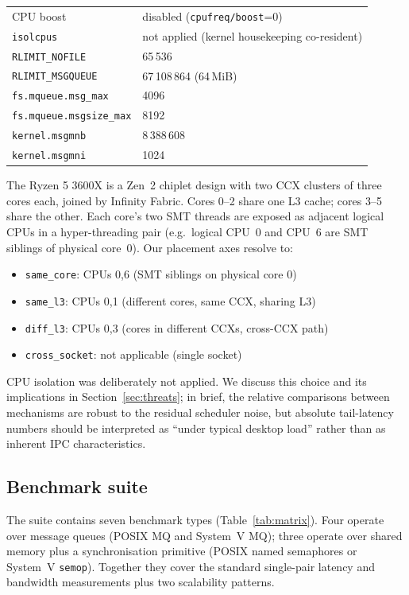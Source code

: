 \documentclass[a4paper,11pt]{article}
\begin{document}
\begin{table}[H]
\begin{tabular}{ll}
CPU boost            & disabled (\texttt{cpufreq/boost}=0) \\
\texttt{isolcpus}    & not applied (kernel housekeeping co-resident) \\
\texttt{RLIMIT\_NOFILE}    & 65\,536 \\
\texttt{RLIMIT\_MSGQUEUE}  & 67\,108\,864 (64\,MiB) \\
\texttt{fs.mqueue.msg\_max}     & 4096 \\
\texttt{fs.mqueue.msgsize\_max} & 8192 \\
\texttt{kernel.msgmnb}          & 8\,388\,608 \\
\texttt{kernel.msgmni}          & 1024 \\
\bottomrule
\end{tabular}
\end{table}

The Ryzen 5 3600X is a Zen~2 chiplet design with two CCX clusters of three
cores each, joined by Infinity Fabric. Cores 0--2 share one L3 cache; cores
3--5 share the other. Each core's two SMT threads are exposed as adjacent
logical CPUs in a hyper-threading pair (e.g.\ logical CPU~0 and CPU~6 are
SMT siblings of physical core~0). Our placement axes resolve to:

\begin{itemize}[leftmargin=*]
\item \texttt{same\_core}: CPUs 0,6 (SMT siblings on physical core 0)
\item \texttt{same\_l3}: CPUs 0,1 (different cores, same CCX, sharing L3)
\item \texttt{diff\_l3}: CPUs 0,3 (cores in different CCXs, cross-CCX path)
\item \texttt{cross\_socket}: not applicable (single socket)
\end{itemize}

CPU isolation was deliberately not applied. We discuss this choice and its
implications in Section~\ref{sec:threats}; in brief, the relative
comparisons between mechanisms are robust to the residual scheduler noise,
but absolute tail-latency numbers should be interpreted as ``under typical
desktop load'' rather than as inherent IPC characteristics.

\subsection{Benchmark suite}
\label{sec:method:suite}

The suite contains seven benchmark types (Table~\ref{tab:matrix}).
Four operate over message queues (POSIX MQ and System~V MQ); three operate
over shared memory plus a synchronisation primitive (POSIX named
semaphores or System~V \texttt{semop}). Together they cover the standard
single-pair latency and bandwidth measurements plus two scalability
patterns.
\end{document}
